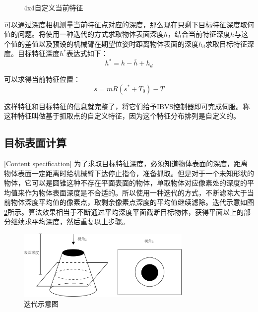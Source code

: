 \documentclass[fontset=fandol,type=bachelor,campus=harbin,bsmainpagenumberline=true]{hithesisbook}
\begin{document}
\begin{figure}[h]
{\begin{minipage}[h]{0.4\textwidth}
		\end{minipage}
		\label{44自定义目标特征}
	}
	\caption{4x4自定义当前特征}
	\label{基于抓取点的4x4自定义特征}
\end{figure}


可以通过深度相机测量当前特征点对应的深度，那么现在只剩下目标特征深度取何值的问题。将使用一种迭代的方式求取物体表面深度$\bar{h}$，结合当前特征深度$h$与这个值的差值以及预设的机械臂在期望位姿时距离物体表面的深度$h_d$求取目标特征深度。目标特征深度$h^*$表达式如下：
\begin{equation}
h^*=h-\bar{h}+h_d
\label{目标特征深度}
\end{equation}


可以求得当前特征位置：
\begin{equation}
s=mR\left( s^*+T_0 \right) -T
\label{当前特征位置}
\end{equation}


这样特征和目标特征的信息就完整了，将它们给予IBVS控制器即可完成伺服。称这种特征叫做基于抓取点的自定义特征，因为这个特征分布排列是自定义的。
\subsection{目标表面计算}[Content specification]
为了求取目标特征深度，必须知道物体表面的深度，距离物体表面一定距离时给机械臂下达停止指令，准备抓取。但是对于一个未知形状的物体，它可以是圆锥这种不存在平面表面的物体，单取物体对应像素处的深度的平均值来作为物体表面深度是不合适的。所以使用一种迭代的方式，不断滤除大于当前物体深度平均值的像素点，取剩余像素点深度的平均值继续滤除。迭代示意如图\ref{迭代示意图}所示。算法效果相当于不断通过平均深度平面截断目标物体，获得平面以上的部分继续求平均深度，然后重复以上步骤。
\begin{figure}[h]
\centering
\includegraphics[width = 0.75\textwidth]{chapter4/迭代示意图}
\caption{迭代示意图}
\label{迭代示意图}
\end{figure}
\end{document}
